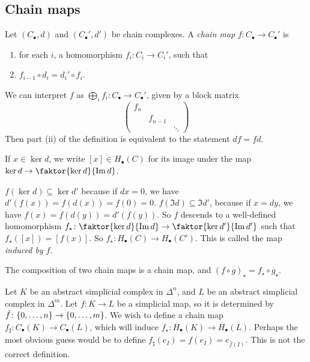 \subsection{Chain maps}
\begin{definition}
	Let \( (C_\bullet, d) \) and \( (C_\bullet', d') \) be chain complexes.
	A \emph{chain map} \( f \colon C_\bullet \to C_\bullet' \) is
	\begin{enumerate}
		\item for each \( i \), a homomorphism \( f_i \colon C_i \to C_i' \), such that
		\item \( f_{i-1} \circ d_i = d_i' \circ f_i \).
	\end{enumerate}
\end{definition}
\begin{remark}
	We can interpret \( f \) as \( \bigoplus_i f_i \colon C_\bullet \to C_\bullet' \), given by a block matrix
	\[ \begin{pmatrix}
		f_n \\
		& f_{n-1} \\
		& & \ddots
	\end{pmatrix} \]
	Then part (ii) of the definition is equivalent to the statement \( d f = f d \).
\end{remark}
If \( x \in \ker d \), we write \( [x] \in H_\bullet(C) \) for its image under the map \( \ker d \to \faktor{\ker d}{\Im d} \).
\begin{remark}
	\( f(\ker d) \subseteq \ker d' \) because if \( dx = 0 \), we have \( d'(f(x)) = f(d(x)) = f(0) = 0 \).
	\( f(\Im d) \subseteq \Im d' \), because if \( x = dy \), we have \( f(x) = f(d(y)) = d'(f(y)) \).
	So \( f \) descends to a well-defined homomorphism \( f_\star \colon \faktor{\ker d}{\Im d} \to \faktor{\ker d'}{\Im d'} \) such that \( f_\star([x]) = [f(x)] \).
	So \( f_\star \colon H_\bullet(C) \to H_\bullet(C') \).
	This is called the map \emph{induced by} \( f \).
\end{remark}
\begin{remark}
	The composition of two chain maps is a chain map, and \( (f \circ g)_\star = f_\star \circ g_\star \).
\end{remark}
Let \( K \) be an abstract simplicial complex in \( \Delta^n \), and \( L \) be an abstract simplicial complex in \( \Delta^m \).
Let \( f \colon K \to L \) be a simplicial map, so it is determined by \( \hat f \colon \qty{0, \dots, n} \to \qty{0, \dots, m} \).
We wish to define a chain map \( f_\sharp \colon C_\bullet(K) \to C_\bullet(L) \), which will induce \( f_\star \colon H_\bullet(K) \to H_\bullet(L) \).
Perhaps the most obvious guess would be to define \( f_\sharp(e_I) = f(e_I) = e_{\hat f(I)} \).
This is not the correct definition.


